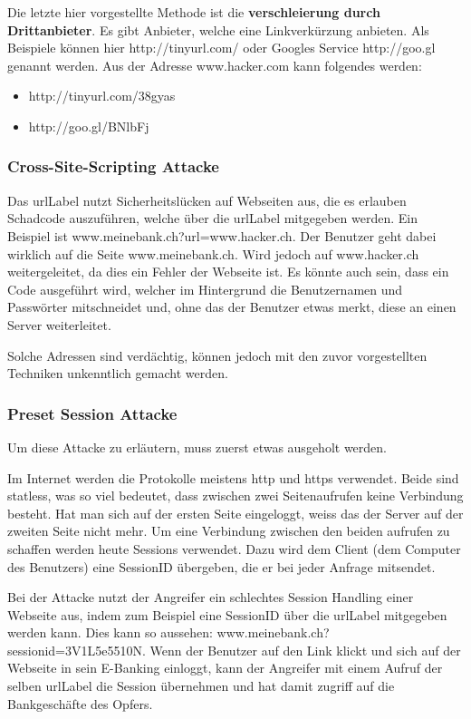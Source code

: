 Die letzte hier vorgestellte Methode ist die \textbf{verschleierung durch Drittanbieter}. Es gibt Anbieter, welche eine Linkverkürzung anbieten. Als Beispiele können hier http://tinyurl.com/ oder Googles Service http://goo.gl genannt werden. Aus der Adresse www.hacker.com kann folgendes werden:

\begin{itemize}
\item http://tinyurl.com/38gyas
\item http://goo.gl/BNlbFj
\end{itemize}

\subsubsection{Cross-Site-Scripting Attacke}
Das \Gls{urlLabel} nutzt Sicherheitslücken auf Webseiten aus, die es erlauben Schadcode auszuführen, welche über die \Gls{urlLabel} mitgegeben werden. Ein Beispiel ist www.meinebank.ch?url=www.hacker.ch. Der Benutzer geht dabei wirklich auf die Seite www.meinebank.ch. Wird jedoch auf www.hacker.ch weitergeleitet, da dies ein Fehler der Webseite ist. Es könnte auch sein, dass ein Code ausgeführt wird, welcher im Hintergrund die Benutzernamen und Passwörter mitschneidet und, ohne das der Benutzer etwas merkt, diese an einen Server weiterleitet.

Solche Adressen sind verdächtig, können jedoch mit den zuvor vorgestellten Techniken unkenntlich gemacht werden.

\subsubsection{Preset Session Attacke}
Um diese Attacke zu erläutern, muss zuerst etwas ausgeholt werden.

Im Internet werden die Protokolle meistens http und https verwendet. Beide sind statless, was so viel bedeutet, dass zwischen zwei Seitenaufrufen keine Verbindung besteht. Hat man sich auf der ersten Seite eingeloggt, weiss das der Server auf der zweiten Seite nicht mehr. Um eine Verbindung zwischen den beiden aufrufen zu schaffen werden heute Sessions verwendet. Dazu wird dem Client (dem Computer des Benutzers) eine SessionID übergeben, die er bei jeder Anfrage mitsendet.

Bei der Attacke nutzt der Angreifer ein schlechtes Session Handling einer Webseite aus, indem zum Beispiel eine SessionID über die \Gls{urlLabel} mitgegeben werden kann. Dies kann so aussehen: www.meinebank.ch?sessionid=3V1L5e5510N. Wenn der Benutzer auf den Link klickt und sich auf der Webseite in sein E-Banking einloggt, kann der Angreifer mit einem Aufruf der selben \Gls{urlLabel} die Session übernehmen und hat damit zugriff auf die Bankgeschäfte des Opfers.

